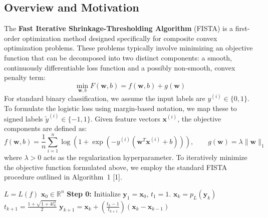 \documentclass[12pt,a4paper]{article}
\begin{document}
\subsection{Overview and Motivation}
The \textbf{Fast Iterative Shrinkage-Thresholding Algorithm} (FISTA) is a first-order optimization method designed specifically for composite convex optimization problems. These problems typically involve minimizing an objective function that can be decomposed into two distinct components: a smooth, continuously differentiable loss function and a possibly non-smooth, convex penalty term:
$$
    \min_{\mathbf{w}, b} F(\mathbf{w}, b) = f(\mathbf{w}, b) + g(\mathbf{w})
$$
For standard binary classification, we assume the input labels are $y^{(i)} \in \{0, 1\}$. To formulate the logistic loss using margin-based notation, we map these to signed labels $\tilde{y}^{(i)} \in \{-1, 1\}$. Given feature vectors $\mathbf{x}^{(i)}$, the objective components are defined as:
$$
    f(\mathbf{w}, b) = \frac{1}{n} \sum_{i=1}^n \log\left(1 + \exp\left(-y^{(i)}(\mathbf{w}^T \mathbf{x}^{(i)} + b)\right)\right), \quad \quad g(\mathbf{w}) = \lambda \|\mathbf{w}\|_1
$$
where $\lambda > 0$ acts as the regularization hyperparameter. To iteratively minimize the objective function formulated above, we employ the standard FISTA procedure outlined in Algorithm~1 [1].
\begin{algorithm}[H]
\caption{FISTA with constant stepsize}
\begin{algorithmic}[1]
\Require $L = L(f)$ 
\Require $\mathbf{x}_0 \in \mathbb{R}^n$
\State \textbf{Step 0:} Initialize $\mathbf{y}_1 = \mathbf{x}_0$, $t_1 = 1$.
    \State $\mathbf{x}_k = p_L(\mathbf{y}_k)$
    \State $t_{k+1} = \frac{1 + \sqrt{1 + 4t_k^2}}{2}$
    \State $\mathbf{y}_{k+1} = \mathbf{x}_k + \left(\frac{t_k - 1}{t_{k+1}}\right)(\mathbf{x}_k - \mathbf{x}_{k-1})$
\EndFor
\end{algorithmic}
\end{algorithm}
\end{document}
